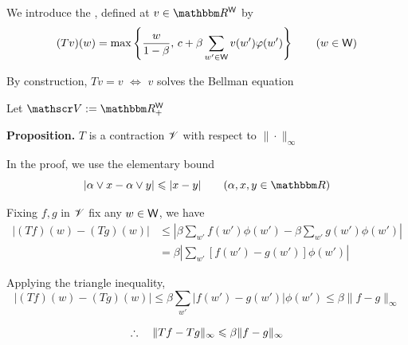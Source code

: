 \begin{frame}

    We introduce the , defined at
    $v \in \RR^\Wsf$ by
    \begin{equation*}
        (Tv)(w) 
        = 
        \max 
        \left\{
            \frac{w}{1-\beta}
            ,\,
            c + \beta \sum_{w' \in \mathsf W} v(w') \varphi(w')
        \right\}
        \qquad (w \in \mathsf W)
    \end{equation*}

    By construction, $Tv=v$ $\iff$ $v$ solves the Bellman equation 

        \vspace{0.5em}
    Let $\vV := \RR^\Wsf_+$ 

        \vspace{0.5em}
    {\bf Proposition.} $T$ is a contraction $\mathscr V$
        with respect to $\| \cdot \|_\infty$

        \vspace{0.5em}
    In the proof, we use the elementary bound
    \begin{equation*}
        |\alpha \vee x - \alpha \vee y| \leq |x - y|
        \qquad (\alpha, x, y \in \RR)
    \end{equation*}

\end{frame}


\begin{frame}
    
    Fixing $f, g$ in $\mathscr V$ fix any $w \in \mathsf W$, we have 
    \begin{align*}
        |(Tf)(w) - (Tg)(w)|
        & \leq \left|
        \beta \sum_{w'} f(w') \phi(w')
                -
                \beta \sum_{w'} g(w') \phi(w')  
            \right|
        \\
        & = \beta 
            \left|
            \sum_{w'} [f(w') - g(w')] \phi(w') 
            \right|
    \end{align*}

    Applying the triangle inequality,
    \begin{equation*}
        |(Tf)(w) - (Tg)(w)|
        \leq \beta \sum_{w'} |f(w') - g(w')| \phi(w') 
        \leq \beta \| f - g \|_\infty 
    \end{equation*}

    \begin{equation*}
        \therefore \quad
        \|Tf - Tg \|_\infty \leqslant \beta \| f - g \|_\infty 
    \end{equation*}

\end{frame}

